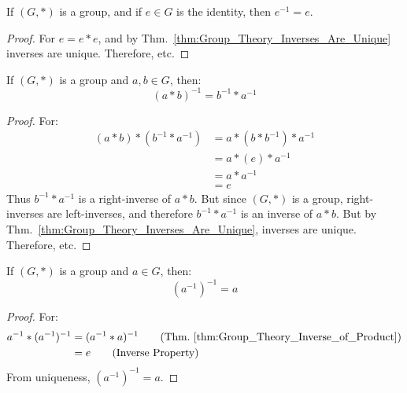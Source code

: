     \begin{theorem}
        If $(G,*)$ is a group, and if $e\in{G}$ is the identity,
        then $e^{-1}=e$.
    \end{theorem}
    \begin{proof}
        For $e=e*e$, and by Thm.~\ref{thm:Group_Theory_Inverses_Are_Unique}
        inverses are unique. Therefore, etc.
    \end{proof}
    \begin{theorem}
        \label{thm:Group_Theory_Inverse_of_Product}
        If $(G,*)$ is a group and $a,b\in G$, then:
        \begin{equation}
            (a*b)^{-1} = b^{-1}*a^{-1}
        \end{equation}
    \end{theorem}
    \begin{proof}
        For:
        \begin{align}
            (a*b)*(b^{-1}*a^{-1})&=
            a*(b*b^{-1})*a^{-1}
            \tag{Associative Property}\\
            &=a*(e)*a^{-1}
            \tag{Inverse Property}\\
            &=a*a^{-1}
            \tag{Identitive Property}\\
            &=e
            \tag{Inverse Property}
        \end{align}
        Thus $b^{-1}*a^{-1}$ is a right-inverse of $a*b$.
        But since $(G,*)$ is a group, right-inverses are
        left-inverses, and therefore $b^{-1}*a^{-1}$ is
        an inverse of $a*b$. But by
        Thm.~\ref{thm:Group_Theory_Inverses_Are_Unique},
        inverses are unique. Therefore, etc.
    \end{proof}
    \begin{theorem}
        If $(G,*)$ is a group and $a\in{G}$, then:
        \begin{equation}
            (a^{-1})^{-1}=a
        \end{equation}
    \end{theorem}
    \begin{proof}
        For:
        \begin{align}
            a^{-1}*(a^{-1})^{-1}
            &=(a^{-1}* a)^{-1}
            \tag{Thm.~\ref{thm:Group_Theory_Inverse_of_Product}}\\
            &=e
            \tag{Inverse Property}
        \end{align}
        From uniqueness, $(a^{-1})^{-1}=a$.
    \end{proof}
